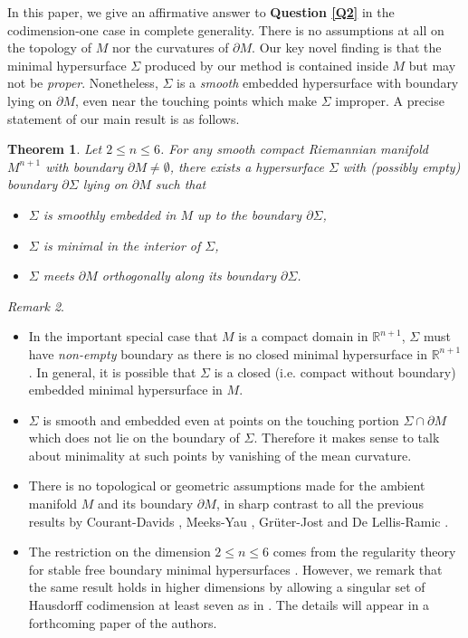 \documentclass[10pt]{amsart}
\newtheorem{theorem}{Theorem}[section]
\theoremstyle{definition}
\theoremstyle{remark}
\newtheorem{remark}[theorem]{Remark}
\numberwithin{equation}{section}
\newcommand{\R}{\mathbb{R}}
\begin{document}
In this paper, we give an affirmative answer to \textbf{Question \ref{Q2}} in the codimension-one case in complete generality. There is no assumptions at all on the topology of $M$ nor the curvatures of $\partial M$. Our key novel finding is that the minimal hypersurface $\Sigma$ produced by our method is contained inside $M$ but may not be \emph{proper}. Nonetheless, $\Sigma$ is a \emph{smooth} embedded hypersurface with boundary lying on $\partial M$, even near the touching points which make $\Sigma$ improper. A precise statement of our main result is as follows.


\begin{theorem}
\label{T:manifold}
Let $2 \leq n \leq 6$. For any smooth compact Riemannian manifold $M^{n+1}$ with boundary $\partial M \neq \emptyset$, there exists a hypersurface $\Sigma$ with (possibly empty) boundary $\partial \Sigma$ lying on $\partial M$ such that 
\begin{itemize}
\item[(i)] $\Sigma$ is smoothly embedded in $M$ up to the boundary $\partial \Sigma$,
\item[(ii)] $\Sigma$ is minimal in the interior of $\Sigma$,
\item[(iii)] $\Sigma$ meets $\partial M$ orthogonally along its boundary $\partial \Sigma$.
\end{itemize}
\end{theorem}

\begin{remark}
\begin{itemize}
\item[(a)] In the important special case that $M$ is a compact domain in $\R^{n+1}$, $\Sigma$ must have \emph{non-empty} boundary as there is no closed minimal hypersurface in $\R^{n+1}$. In general, it is possible that $\Sigma$ is a closed (i.e. compact without boundary) embedded minimal hypersurface in $M$.
\item[(b)] $\Sigma$ is smooth and %
embedded even at points on the touching portion $\Sigma \cap \partial M$ which does not lie on the boundary of $\Sigma$. Therefore it makes sense to talk about minimality at such points by vanishing of the mean curvature.
\item[(c)] There is no topological or geometric assumptions made for the ambient manifold $M$ and its boundary $\partial M$, in sharp contrast to all the previous results by Courant-Davids \cite{Courant-Davids40}, Meeks-Yau \cite{Meeks-Yau80}, Gr\"{u}ter-Jost \cite{Gruter-Jost86a} and De Lellis-Ramic \cite{DeLellis-Ramic}.
\item[(d)] The restriction on the dimension $2 \leq n \leq 6$ comes from the regularity theory for stable free boundary minimal hypersurfaces \cite{Li-Zhou-A}. However, we remark that the same result holds in higher dimensions by allowing a singular set of Hausdorff codimension at least seven as in \cite{Schoen-Simon81}. The details will appear in a forthcoming paper of the authors.
\end{itemize}
\end{remark}
\end{document}
